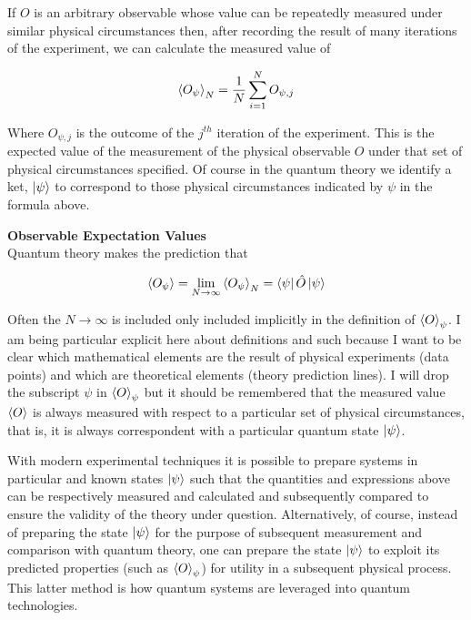 \documentclass[12pt]{article}
\begin{document}
If $O$ is an arbitrary observable whose value can be repeatedly measured under similar physical circumstances then, after recording the result of many iterations of the experiment, we can calculate the measured value of

\begin{align}
\Braket{O_{\psi}}_N = \frac{1}{N}\sum_{i=1}^N O_{\psi,j}
\end{align}

Where $O_{\psi,j}$ is the outcome of the $j^{th}$ iteration of the experiment.
This is the expected value of the measurement of the physical observable $O$ under that set of physical circumstances specified. Of course in the quantum theory we identify a ket, $\ket{\psi}$ to correspond to those physical circumstances indicated by $\psi$ in the formula above. 

\begin{tcolorbox}
\textbf{Observable Expectation Values}\\
Quantum theory makes the prediction that

\begin{align}
\Braket{O_{\psi}} = \lim_{N\rightarrow \infty} \Braket{O_{\psi}}_N = \bra{\psi} \hat{O} \ket{\psi}
\end{align}

\end{tcolorbox}

Often the $N\rightarrow 
\infty$ is included only included implicitly in the definition of $\Braket{O}_{\psi}$. I am being particular explicit here about definitions and such because I want to be clear which mathematical elements are the result of physical experiments (data points) and which are theoretical elements (theory prediction lines). I will drop the subscript $\psi$ in $\Braket{O}_{\psi}$ but it should be remembered that the measured value $\Braket{O}$ is always measured with respect to a particular set of physical circumstances, that is, it is always correspondent with a particular quantum state $\ket{\psi}$. 

With modern experimental techniques it is possible to prepare systems in particular and known states $\ket{\psi}$ such that the quantities and expressions above can be respectively measured and calculated and subsequently compared to ensure the validity of the theory under question. Alternatively, of course, instead of preparing the state $\ket{\psi}$ for the purpose of subsequent measurement and comparison with quantum theory, one can prepare the state $\ket{\psi}$ to exploit its predicted properties (such as $\Braket{O}_{\psi}$) for utility in a subsequent physical process. This latter method is how quantum systems are leveraged into quantum technologies.
\end{document}
